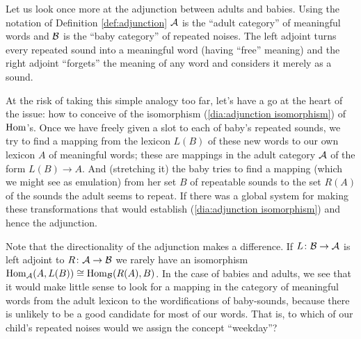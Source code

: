\documentclass[CT4S-EN-RU]{subfiles}
\begin{document}
\begin{exerciseRUS}\label{ex:monoid adjunction}
\end{exerciseRUS}

\begin{blockENG}
Let us look once more at the adjunction between adults and babies. Using the notation of Definition \ref{def:adjunction} $\mathcal{A}$ is the “adult category” of meaningful words and $\mathcal{B}$ is the “baby category” of repeated noises. The left adjoint turns every repeated sound into a meaningful word (having “free” meaning) and the right adjoint “forgets” the meaning of any word and considers it merely as a sound. 
\end{blockENG}

\begin{blockRUS}
\end{blockRUS}

\begin{blockENG}
At the risk of taking this simple analogy too far, let's have a go at the heart of the issue: how to conceive of the isomorphism (\ref{dia:adjunction isomorphism}) of $\textnormal{Hom}$'s. Once we have freely given a slot to each of baby's repeated sounds, we try to find a mapping from the lexicon $L(B)$ of these new words to our own lexicon $A$ of meaningful words; these are mappings in the adult category $\mathcal{A}$ of the form $L(B)\to A.$ And (stretching it) the baby tries to find a mapping (which we might see as emulation) from her set $B$ of repeatable sounds to the set $R(A)$ of the sounds the adult seems to repeat. If there was a global system for making these transformations that would establish  (\ref{dia:adjunction isomorphism}) and hence the adjunction.
\end{blockENG}

\begin{blockRUS}
\end{blockRUS}

\begin{blockENG}
Note that the directionality of the adjunction makes a difference. If $L\colon\mathcal{B}\rightarrow\mathcal{A}$ is left adjoint to $R\colon\mathcal{A}\rightarrow\mathcal{B}$ we rarely have an isomorphism $\textnormal{Hom}_\mathcal{A}(A,L(B))\cong\textnormal{Hom}_\mathcal{B}(R(A),B)$. In the case of babies and adults, we see that it would make little sense to look for a mapping in the category of meaningful words from the adult lexicon to the wordifications of baby-sounds, because there is unlikely to be a good candidate for most of our words. That is, to which of our child's repeated noises would we assign the concept “weekday”? 
\end{blockENG}
\end{document}
